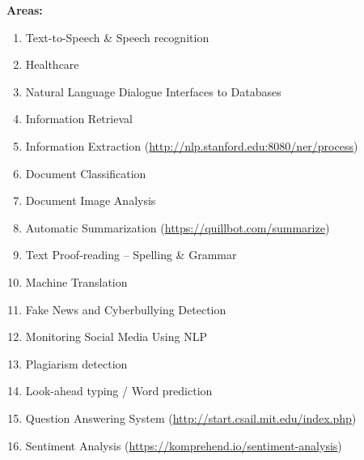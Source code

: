 \vspace{0.3cm}

\textbf{Areas:}
\begin{enumerate}
    \item Text-to-Speech \& Speech recognition
    \item Healthcare
    \item Natural Language Dialogue Interfaces to Databases
    \item Information Retrieval
    \item Information Extraction (\href{http://nlp.stanford.edu:8080/ner/process}{http://nlp.stanford.edu:8080/ner/process}) 
    \item Document Classification
    \item Document Image Analysis
    \item Automatic Summarization (\href{https://quillbot.com/summarize}{https://quillbot.com/summarize}) 
    \item Text Proof-reading – Spelling \& Grammar
    \item Machine Translation
    \item Fake News and Cyberbullying Detection
    \item Monitoring Social Media Using NLP
    \item Plagiarism detection
    \item Look-ahead typing / Word prediction
    \item Question Answering System (\href{http://start.csail.mit.edu/index.php}{http://start.csail.mit.edu/index.php}) 
    \item Sentiment Analysis (\href{https://komprehend.io/sentiment-analysis}{https://komprehend.io/sentiment-analysis}) 
\end{enumerate}






















































